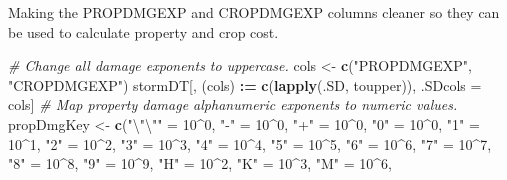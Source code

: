 \documentclass[
]{article}
\newenvironment{Shaded}{\begin{snugshade}}{\end{snugshade}}
\newcommand{\CharTok}[1]{\textcolor[rgb]{0.31,0.60,0.02}{#1}}
\newcommand{\CommentTok}[1]{\textcolor[rgb]{0.56,0.35,0.01}{\textit{#1}}}
\newcommand{\DecValTok}[1]{\textcolor[rgb]{0.00,0.00,0.81}{#1}}
\newcommand{\ErrorTok}[1]{\textcolor[rgb]{0.64,0.00,0.00}{\textbf{#1}}}
\newcommand{\KeywordTok}[1]{\textcolor[rgb]{0.13,0.29,0.53}{\textbf{#1}}}
\newcommand{\NormalTok}[1]{#1}
\newcommand{\OperatorTok}[1]{\textcolor[rgb]{0.81,0.36,0.00}{\textbf{#1}}}
\newcommand{\StringTok}[1]{\textcolor[rgb]{0.31,0.60,0.02}{#1}}
\begin{document}
Making the PROPDMGEXP and CROPDMGEXP columns cleaner so they can be used
to calculate property and crop cost.

\begin{Shaded}
\begin{Highlighting}[]
\CommentTok{# Change all damage exponents to uppercase.}
\NormalTok{cols <-}\StringTok{ }\KeywordTok{c}\NormalTok{(}\StringTok{"PROPDMGEXP"}\NormalTok{, }\StringTok{"CROPDMGEXP"}\NormalTok{)}
\NormalTok{stormDT[,  (cols) }\OperatorTok{:}\ErrorTok{=}\StringTok{ }\KeywordTok{c}\NormalTok{(}\KeywordTok{lapply}\NormalTok{(.SD, toupper)), .SDcols =}\StringTok{ }\NormalTok{cols]}
\CommentTok{# Map property damage alphanumeric exponents to numeric values.}
\NormalTok{propDmgKey <-}\StringTok{  }\KeywordTok{c}\NormalTok{(}\StringTok{"}\CharTok{\textbackslash{}"\textbackslash{}"}\StringTok{"}\NormalTok{ =}\StringTok{ }\DecValTok{10}\OperatorTok{^}\DecValTok{0}\NormalTok{,}
                 \StringTok{"-"}\NormalTok{ =}\StringTok{ }\DecValTok{10}\OperatorTok{^}\DecValTok{0}\NormalTok{, }
                 \StringTok{"+"}\NormalTok{ =}\StringTok{ }\DecValTok{10}\OperatorTok{^}\DecValTok{0}\NormalTok{,}
                 \StringTok{"0"}\NormalTok{ =}\StringTok{ }\DecValTok{10}\OperatorTok{^}\DecValTok{0}\NormalTok{,}
                 \StringTok{"1"}\NormalTok{ =}\StringTok{ }\DecValTok{10}\OperatorTok{^}\DecValTok{1}\NormalTok{,}
                 \StringTok{"2"}\NormalTok{ =}\StringTok{ }\DecValTok{10}\OperatorTok{^}\DecValTok{2}\NormalTok{,}
                 \StringTok{"3"}\NormalTok{ =}\StringTok{ }\DecValTok{10}\OperatorTok{^}\DecValTok{3}\NormalTok{,}
                 \StringTok{"4"}\NormalTok{ =}\StringTok{ }\DecValTok{10}\OperatorTok{^}\DecValTok{4}\NormalTok{,}
                 \StringTok{"5"}\NormalTok{ =}\StringTok{ }\DecValTok{10}\OperatorTok{^}\DecValTok{5}\NormalTok{,}
                 \StringTok{"6"}\NormalTok{ =}\StringTok{ }\DecValTok{10}\OperatorTok{^}\DecValTok{6}\NormalTok{,}
                 \StringTok{"7"}\NormalTok{ =}\StringTok{ }\DecValTok{10}\OperatorTok{^}\DecValTok{7}\NormalTok{,}
                 \StringTok{"8"}\NormalTok{ =}\StringTok{ }\DecValTok{10}\OperatorTok{^}\DecValTok{8}\NormalTok{,}
                 \StringTok{"9"}\NormalTok{ =}\StringTok{ }\DecValTok{10}\OperatorTok{^}\DecValTok{9}\NormalTok{,}
                 \StringTok{"H"}\NormalTok{ =}\StringTok{ }\DecValTok{10}\OperatorTok{^}\DecValTok{2}\NormalTok{,}
                 \StringTok{"K"}\NormalTok{ =}\StringTok{ }\DecValTok{10}\OperatorTok{^}\DecValTok{3}\NormalTok{,}
                 \StringTok{"M"}\NormalTok{ =}\StringTok{ }\DecValTok{10}\OperatorTok{^}\DecValTok{6}\NormalTok{,}

\end{Highlighting}
\end{Shaded}
\end{document}

